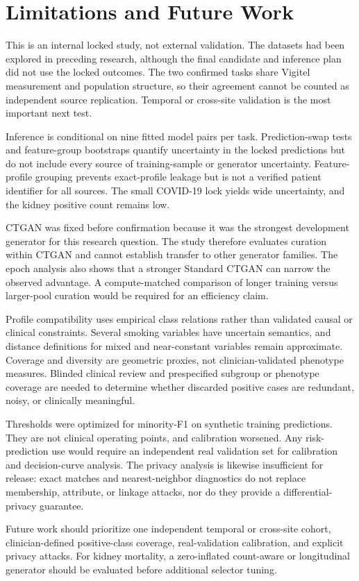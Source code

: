 \section{Limitations and Future Work}
\label{sec:limitations}

This is an internal locked study, not external validation. The datasets had been explored in preceding research, although the final candidate and inference plan did not use the locked outcomes. The two confirmed tasks share Vigitel measurement and population structure, so their agreement cannot be counted as independent source replication. Temporal or cross-site validation is the most important next test.

Inference is conditional on nine fitted model pairs per task. Prediction-swap tests and feature-group bootstraps quantify uncertainty in the locked predictions but do not include every source of training-sample or generator uncertainty. Feature-profile grouping prevents exact-profile leakage but is not a verified patient identifier for all sources. The small COVID-19 lock yields wide uncertainty, and the kidney positive count remains low.

CTGAN was fixed before confirmation because it was the strongest development generator for this research question. The study therefore evaluates curation within CTGAN and cannot establish transfer to other generator families. The epoch analysis also shows that a stronger Standard CTGAN can narrow the observed advantage. A compute-matched comparison of longer training versus larger-pool curation would be required for an efficiency claim.

Profile compatibility uses empirical class relations rather than validated causal or clinical constraints. Several smoking variables have uncertain semantics, and distance definitions for mixed and near-constant variables remain approximate. Coverage and diversity are geometric proxies, not clinician-validated phenotype measures. Blinded clinical review and prespecified subgroup or phenotype coverage are needed to determine whether discarded positive cases are redundant, noisy, or clinically meaningful.

Thresholds were optimized for minority-F1 on synthetic training predictions. They are not clinical operating points, and calibration worsened. Any risk-prediction use would require an independent real validation set for calibration and decision-curve analysis. The privacy analysis is likewise insufficient for release: exact matches and nearest-neighbor diagnostics do not replace membership, attribute, or linkage attacks, nor do they provide a differential-privacy guarantee.

Future work should prioritize one independent temporal or cross-site cohort, clinician-defined positive-class coverage, real-validation calibration, and explicit privacy attacks. For kidney mortality, a zero-inflated count-aware or longitudinal generator should be evaluated before additional selector tuning.
